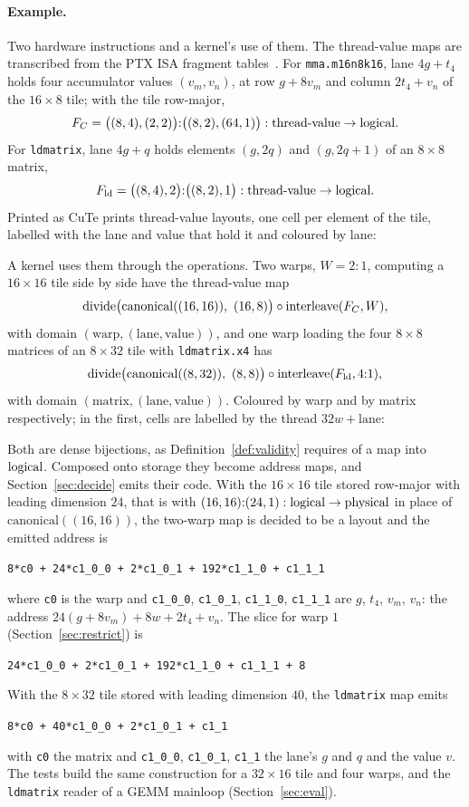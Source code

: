 \paragraph{Example.} Two hardware instructions and a kernel's use of them.
The thread-value maps are transcribed from the PTX ISA fragment
tables~\cite{ptx}. For
\texttt{mma.m16n8k16}, lane $4g + t_4$ holds four accumulator values
$(v_m, v_n)$, at row $g + 8v_m$ and column $2t_4 + v_n$ of the $16 \times 8$
tile; with the tile row-major,
\[
F_C = \big((8,4),(2,2)\big){:}\big((8,2),(64,1)\big) : \textrm{thread-value} \to \textrm{logical} .
\]
For \texttt{ldmatrix}, lane $4g + q$ holds elements $(g, 2q)$ and $(g, 2q+1)$
of an $8 \times 8$ matrix,
\[
F_{\mathrm{ld}} = \big((8,4),2\big){:}\big((8,2),1\big) : \textrm{thread-value} \to \textrm{logical} .
\]
Printed as CuTe prints thread-value layouts, one cell per element of the tile,
labelled with the lane and value that hold it and coloured by lane:

A kernel uses them through the operations. Two warps, $W = 2{:}1$, computing
a $16 \times 16$ tile side by side have the thread-value map
\[
\divideop\big(\mathrm{canonical}((16,16)),\ (16,8)\big) \circ \interleave(F_C, W),
\]
with domain $(\text{warp}, (\text{lane}, \text{value}))$, and one warp loading
the four $8 \times 8$ matrices of an $8 \times 32$ tile with
\texttt{ldmatrix.x4} has
\[
\divideop\big(\mathrm{canonical}((8,32)),\ (8,8)\big) \circ \interleave(F_{\mathrm{ld}}, 4{:}1),
\]
with domain $(\text{matrix}, (\text{lane}, \text{value}))$. Coloured by warp
and by matrix respectively; in the first, cells are labelled by the thread
$32w + \text{lane}$:


Both are dense bijections, as Definition~\ref{def:validity} requires of a map
into $\textrm{logical}$. Composed onto storage they become address maps, and
Section~\ref{sec:decide} emits their code. With the $16 \times 16$ tile
stored row-major with leading dimension $24$, that is with
$(16,16){:}(24,1) : \textrm{logical} \to \textrm{physical}$ in place of
$\mathrm{canonical}((16,16))$, the two-warp map is decided to be a layout and
the emitted address is
\begin{center}
\verb|8*c0 + 24*c1_0_0 + 2*c1_0_1 + 192*c1_1_0 + c1_1_1|
\end{center}
where \verb|c0| is the warp and \verb|c1_0_0|, \verb|c1_0_1|,
\verb|c1_1_0|, \verb|c1_1_1| are $g$, $t_4$, $v_m$, $v_n$: the address
$24(g + 8v_m) + 8w + 2t_4 + v_n$. The slice for warp $1$
(Section~\ref{sec:restrict}) is
\begin{center}
\verb|24*c1_0_0 + 2*c1_0_1 + 192*c1_1_0 + c1_1_1 + 8|
\end{center}
With the $8 \times 32$ tile stored with leading dimension $40$, the
\texttt{ldmatrix} map emits
\begin{center}
\verb|8*c0 + 40*c1_0_0 + 2*c1_0_1 + c1_1|
\end{center}
with \verb|c0| the matrix and \verb|c1_0_0|, \verb|c1_0_1|, \verb|c1_1|
the lane's $g$ and $q$ and the value $v$. The tests build the same
construction for a $32 \times 16$ tile and four warps, and the
\texttt{ldmatrix} reader of a GEMM mainloop (Section~\ref{sec:eval}).

